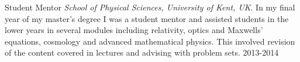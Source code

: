 \begin{cvhonors}

\cvhonor
{Student Mentor} %
{\textit{School of Physical Sciences, University of Kent, UK}. \newline In my final year of my master's degree I was a student mentor and assisted students in the lower years in several modules including relativity, optics and Maxwells' equations, cosmology and advanced mathematical physics. This involved revision of the content covered in lectures and advising with problem sets.} %
{} %
{2013-2014} %


\end{cvhonors}

